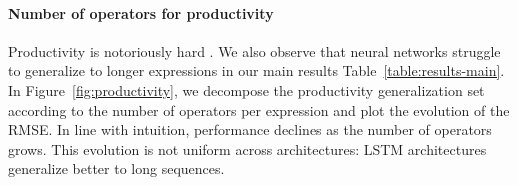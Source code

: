 \paragraph{Number of operators for productivity} Productivity is notoriously hard \parencite{kim_20, hupkes_20, baroni_19}. We also observe that neural networks struggle to generalize to longer expressions in our main results Table~\ref{table:results-main}. In Figure~\ref{fig:productivity}, we decompose the productivity generalization set according to the number of operators per expression and plot the evolution of the RMSE. In line with intuition, performance declines as the number of operators grows. This evolution is not uniform across architectures: LSTM architectures generalize better to long sequences. 

